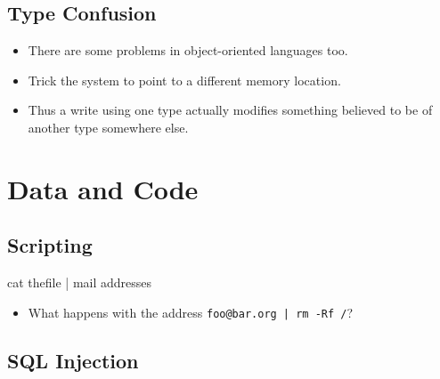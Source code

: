 \documentclass{beamer}
\newcommand{\code}[2][style=code]{\lstinline[#1]`#2`}
\begin{document}


%

\subsection{Type Confusion}

\begin{frame}{\insertsubsectionhead}
  \begin{itemize}
    \item There are some problems in object-oriented languages too.
    \item Trick the system to point to a different memory location.
    \item Thus a write using one type actually modifies something believed to 
      be of another type somewhere else.
  \end{itemize}
\end{frame}


\section{Data and Code}

\subsection{Scripting}


\begin{frame}[fragile]{\insertsubsectionhead}
  \begin{src}
    cat thefile | mail addresses
  \end{src}
  \begin{itemize}
    \item What happens with the address \code{foo@bar.org | rm -Rf /}?
  \end{itemize}
\end{frame}

\subsection{SQL Injection}
\end{document}
